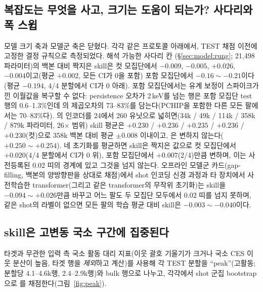 \documentclass[10pt,a4paper]{article}
\begin{document}
\subsection{복잡도는 무엇을 사고, 크기는 도움이 되는가? 사다리와 폭 스윕}
\label{sec:ladder}

모델 크기 축과 모델군 축은 닫혔다. 각각 같은 프로토콜 아래에서, TEST 채점 이전에
고정한 결정 규칙으로 측정되었다. 해석 가능한 사다리 칸
\bthree{}(\S\ref{sec:model:rung}; 21{,}498 파라미터)의 백본 대비 짝지은 \Ti{} skill은
컷 모집단에서 $-0.009$, $-0.005$, $+0.026$, $-0.004$이고(평균 $+0.002$, 모든 CI가 0을
포함) 포함 모집단에서 $-0.16\sim-0.21$이다(평균 $-0.194$, 4/4 분할에서 CI가 0 아래).
포함 모집단에서는 유계 보정이 스파이크가 낀 이월값을 복구할 수 없다: persistence
오차가 2\,keV를 넘는 행은 포함 모집단 test 행의 0.6--1.3\%인데 \bthree{}의 \Ti{}
제곱오차의 73--83\%를 담는다(PCHIP을 포함한 다른 모든 팔에서는 70--83\%다). \seqv{}의
\Ti{} 인코더를 24에서 260 유닛으로 넓히면(34k / 49k / 114k / 358k / 879k 파라미터,
26$\times$ 범위) \Ti{} skill 평균은 $+0.230$ / $+0.236$ / $+0.235$ / $+0.236$ /
$+0.230$(컷)으로 358k 백본 대비 평균 $\pm 0.008$ 이내이고, \Vrot{}은 변하지
않는다($+0.250\sim+0.254$). 네 초기화를 평균하면 \Ti{} skill은 짝지은 값으로 컷
모집단에서 $+0.020$(4/4 분할에서 CI가 0 위), 포함 모집단에서 $+0.007$(2/4)만큼
변하며, 이는 사전등록된 0.02 띠의 경계에 있고 그것을 넘지 않는다. 오프라인 모델군
카드(gap-filling, 백본의 양방향판을 상대로 채점)에서 shot 인코딩 신경 과정과 타
장치에서 사전학습한 transformer(그리고 같은 transformer의 무작위 초기화)는 \Ti{}
skill을 $-0.094\sim+0.026$만큼 바꾸고 어느 팔도 두 모집단 모두에서 0.02 띠를 넘지
못하며, 같은 shot의 \Vrot{} 라벨이 없으면 모든 팔의 학습 평균 대비 skill은
$-0.003\sim-0.040$이다.

\subsection{skill은 고변동 국소 구간에 집중된다}
\label{sec:peak}
타겟과 무관한 입력 측 국소 활동 대리 지표(이웃 괄호 기울기가 크거나 국소 CES
이웃 분산이 높음, 타겟 행을 \emph{제외}하고 계산)를 사용해 각 TEST 분할을
``peak''(고활동; 분할당 \Ti{} 4.1--4.6k행, \Vrot{} 2.4--2.9k행)와 bulk 행으로
나누고, 각각에서 shot 군집 bootstrap으로 \seqv{}를 채점한다(그림~\ref{fig:peak}).
\end{document}
